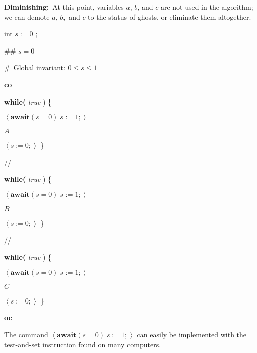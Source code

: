 \documentclass[muchmore,11pt]{article}%
\begin{document}
\textbf{Diminishing:}\ At this point, variables $a$, $b$, and $c$ are not used
in the algorithm; we can demote $a$, $b,$ and $c$ to the status of ghosts, or
eliminate them altogether.

\begin{code}
int $s:=0$ ;

\#\# $s=0$

\#\ Global invariant: $0\leq s\leq1$

\textbf{co}

\begin{indent}
\item \textbf{while(} \textit{true} ) \{

\begin{indent}
\item $\left\langle \mathbf{await}(s=0)\;s:=1;\right\rangle $

\item $A$

\item $\left\langle s:=0;\right\rangle $ \}
\end{indent}
\end{indent}

//

\begin{indent}
\item \textbf{while(} \textit{true} ) \{

\begin{indent}
\item $\left\langle \mathbf{await}(s=0)\;s:=1;\right\rangle $

\item $B$

\item $\left\langle s:=0;\right\rangle $ \}
\end{indent}
\end{indent}

//

\begin{indent}
\item \textbf{while(} \textit{true} ) \{

\begin{indent}
\item $\left\langle \mathbf{await}(s=0)\;s:=1;\right\rangle $

\item $C$

\item $\left\langle s:=0;\right\rangle $ \}
\end{indent}
\end{indent}

\textbf{oc}
\end{code}

The command $\left\langle \mathbf{await}(s=0)\;s:=1;\right\rangle $ can easily
be implemented with the test-and-set instruction found on many computers.



\end{document}
